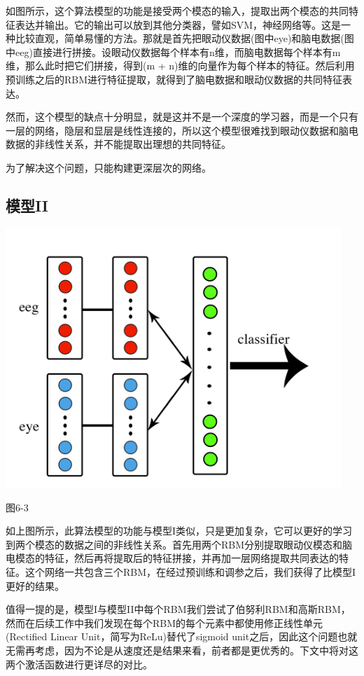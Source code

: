 	如图所示，这个算法模型的功能是接受两个模态的输入，提取出两个模态的共同特征表达并输出。它的输出可以放到其他分类器，譬如SVM，神经网络等。这是一种比较直观，简单易懂的方法。那就是首先把眼动仪数据(图中eye)和脑电数据(图中eeg)直接进行拼接。设眼动仪数据每个样本有n维，而脑电数据每个样本有m维，那么此时把它们拼接，得到(m + n)维的向量作为每个样本的特征。然后利用预训练之后的RBM进行特征提取，就得到了脑电数据和眼动仪数据的共同特征表达。
	
	然而，这个模型的缺点十分明显，就是这并不是一个深度的学习器，而是一个只有一层的网络，隐层和显层是线性连接的，所以这个模型很难找到眼动仪数据和脑电数据的非线性关系，并不能提取出理想的共同特征。
	
	为了解决这个问题，只能构建更深层次的网络。	
	\subsection{模型II}
		\centerline{\includegraphics[width=5in]{figure/classify1.png}}
		\centerline{图6-3}
		如上图所示，此算法模型的功能与模型I类似，只是更加复杂，它可以更好的学习到两个模态的数据之间的非线性关系。首先用两个RBM分别提取眼动仪模态和脑电模态的特征，然后再将提取后的特征拼接，并再加一层网络提取共同表达的特征。这个网络一共包含三个RBM，在经过预训练和调参之后，我们获得了比模型I更好的结果。
		
		值得一提的是，模型I与模型II中每个RBM我们尝试了伯努利RBM和高斯RBM，然而在后续工作中我们发现在每个RBM的每个元素中都使用修正线性单元(Rectified Linear Unit，简写为ReLu)替代了sigmoid unit之后，因此这个问题也就无需再考虑，因为不论是从速度还是结果来看，前者都是更优秀的。下文中将对这两个激活函数进行更详尽的对比。

